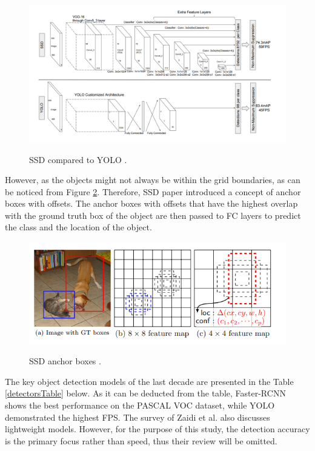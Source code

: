 \documentclass[english, 12pt, a4paper, elec, utf8, a-1b, online]{aaltothesis}
\begin{document}
\begin{figure}[htb]
	\begin{center}
		\includegraphics[width=14cm]{./ssd_yolo.png}
	\end{center}
	\caption{SSD compared to YOLO \cite{Liu2015}.}
	\begin{center}
		\label{ssd}
	\end{center}
\end{figure}
\FloatBarrier

However, as the objects might not always be within the grid boundaries, as can be noticed from Figure \ref{ssd_boxes}. Therefore, SSD paper introduced a concept of anchor boxes with offsets. The anchor boxes with offsets that have the highest overlap with the ground truth box of the object are then passed to FC layers to predict the class and the location of the object. 

\begin{figure}[htb]
	\begin{center}
		\includegraphics[width=12cm]{./ssd_boxes.png}
	\end{center}
	\caption{SSD anchor boxes \cite{Liu2015}.}
	\begin{center}
		\label{ssd_boxes}
	\end{center}
\end{figure}
\FloatBarrier

The key object detection models of the last decade are presented in the Table \ref{detectorsTable} below. As it can be deducted from the table, Faster-RCNN shows the best performance on the PASCAL VOC dataset, while YOLO demonstrated the highest FPS. The survey of Zaidi et al. \cite{Zaidi2021} also discusses lightweight models. However, for the purpose of this study, the detection accuracy is the primary focus rather than speed, thus their review will be omitted. 
\end{document}
